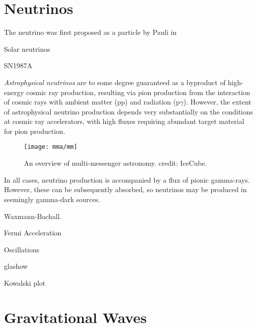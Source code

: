 \section{Neutrinos}

The neutrino was first proposed as a particle by Pauli in 

Solar neutrinos

SN1987A

\emph{Astrophysical neutrinos} are to some degree guaranteed as a byproduct of high-energy cosmic ray production, resulting via pion production from the interaction of cosmic rays with ambient matter (pp) and radiation (p$\gamma$). However, the extent of astrophysical neutrino production depends very substantially on the conditions at cosmic ray accelerators, with high fluxes requiring abundant target material for pion production.

\begin{figure}[!ht]
	\centering \texttt{[image: mma/mm]}
	\caption{An overview of multi-messenger astronomy. credit: IceCube.}
	\label{fig:mm}
\end{figure}

In all cases, neutrino production is accompanied by a flux of pionic gamma-rays. However, these can be subsequently absorbed, so neutrinos may be produced in seemingly gamma-dark sources.

Waxmann-Bachall.

Fermi Acceleration

Oscillations

glashow

Kowalski plot

\section{Gravitational Waves}